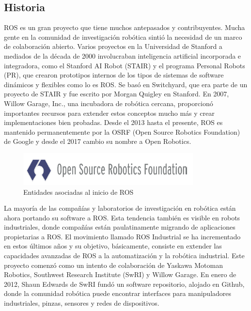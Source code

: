     \subsection{Historia}
    
        ROS es un gran proyecto que tiene muchos antepasados y contribuyentes. Mucha gente en la comunidad de investigación robótica sintió la necesidad de un marco de colaboración abierto. Varios proyectos en la Universidad de Stanford a mediados de la década de 2000 involucraban inteligencia artificial incorporada e integradora, como el Stanford AI Robot (STAIR) y el programa Personal Robots (PR), que crearon prototipos internos de los tipos de sistemas de software dinámicos y flexibles como lo es ROS. Se basó en Switchyard, que era parte de un proyecto de STAIR y fue escrito por Morgan Quigley en Stanford. En 2007, Willow Garage, Inc., una incubadora de robótica cercana, proporcionó importantes recursos para extender estos conceptos mucho más y crear implementaciones bien probadas. Desde el 2013 hasta el presente, ROS es mantenido permanentemente por la OSRF (Open Source Robotics Foundation) de Google y desde el 2017 cambio su nombre a Open Robotics.
        
        \begin{figure}[htbp]
            \centering
            \includegraphics[width=0.7\linewidth]{Main/Chapter3/Images3/3-4/entidade-asociadas-al-inicio-de-ros-3.png}
            \caption{Entidades asociadas al inicio de ROS} 
            \label{f:Cap3-4_entidades_inicio_ros_334}
        \end{figure}        
        
        \newpage
        
        La mayoría de las compañías y laboratorios de investigación en robótica están ahora portando su software a ROS. Esta tendencia también es visible en robots industriales, donde compañías están paulatinamente migrando de aplicaciones propietarias a ROS. El movimiento llamado ROS Industrial se ha incrementado en estos últimos años y su objetivo, básicamente, consiste en extender las capacidades avanzadas de ROS a la automatización y la robótica industrial. Este proyecto comenzó como un intento de colaboración de Yaskawa Motoman Robotics, Southwest Research Institute (SwRI) y Willow Garage. En enero de 2012, Shaun Edwards de SwRI fundó un software repositorio, alojado en Github, donde la comunidad robótica puede encontrar interfaces para manipuladores industriales, pinzas, sensores y redes de dispositivos.
        
